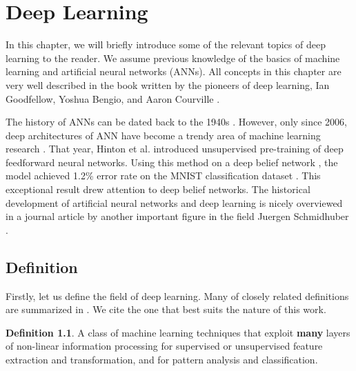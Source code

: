 \chapter{Deep Learning}\label{deep_learning_chapter}


In this chapter, we will briefly introduce some of the relevant topics of deep learning to the reader. We assume previous knowledge of the basics of machine learning and artificial neural networks (ANNs). All concepts in this chapter are very well described in the book written by the pioneers of deep learning, Ian Goodfellow, Yoshua Bengio, and Aaron Courville \cite{Goodfellow-et-al-2016}. 

The history of ANNs can be dated back to the 1940s \cite{McCulloch_1943}. However, only since 2006, deep architectures of ANN have become a trendy area of machine learning research \cite{DBLP:journals/corr/Schmidhuber14}. That year, Hinton et al. introduced unsupervised pre-training of deep feedforward neural networks. Using this method on a deep belief network \cite{DBN}, the model achieved 1.2\% error rate on the MNIST classification dataset \cite{mnist}. This exceptional result drew attention to deep belief networks. The historical development of artificial neural networks and deep learning is nicely overviewed in a journal article by another important figure in the field Juergen Schmidhuber 
\cite{DBLP:journals/corr/Schmidhuber14}.

\section{Definition}
Firstly, let us define the field of deep learning. Many of closely related definitions are summarized in \cite{mic_definitions}. We cite the one that best suits the nature of this work.  
    
\theoremstyle{definition}
\newtheorem*{definition}{Definition}
\begin{definition}
A class of machine learning techniques that exploit \textbf{many} layers of non-linear information processing for supervised or unsupervised feature extraction and transformation, and for pattern analysis and classification.
\end{definition}

